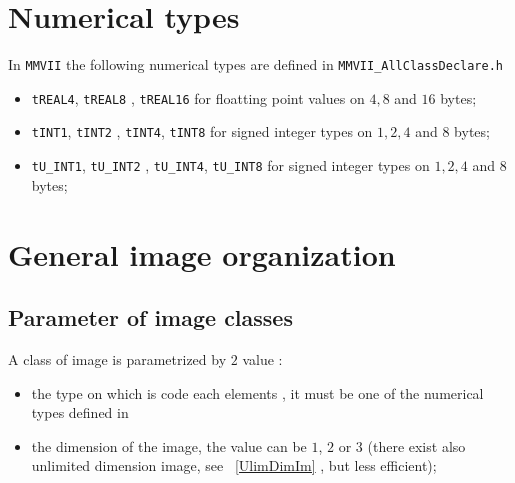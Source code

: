 
\section{Numerical types}

\label{NumericalType}

In {\tt MMVII} the following numerical types are defined in  {\tt MMVII\_AllClassDeclare.h}


\begin{itemize}
    \item {\tt tREAL4}, {\tt tREAL8} , {\tt tREAL16} for floatting point values on
	    $4,8$ and $16$ bytes;

    \item {\tt tINT1}, {\tt tINT2} , {\tt  tINT4}, {\tt  tINT8} for signed integer types
	    on $1,2,4$ and $8$ bytes;

    \item {\tt tU\_INT1}, {\tt tU\_INT2} , {\tt  tU\_INT4}, {\tt  tU\_INT8} for signed integer types
            on $1,2,4$ and $8$ bytes;
\end{itemize}




\section{General image organization}

\subsection{Parameter of image classes}

A class of image is parametrized by $2$ value :

\begin{itemize}
   \item the type on which is code each elements , it must be one of the numerical types
	   defined in \label{NumericalType}

   \item the dimension of the image,  the value can be $1$, $2$ or $3$ (there exist
	   also  unlimited dimension image, see ~\ref{UlimDimIm}  , but less efficient);
\end{itemize}


